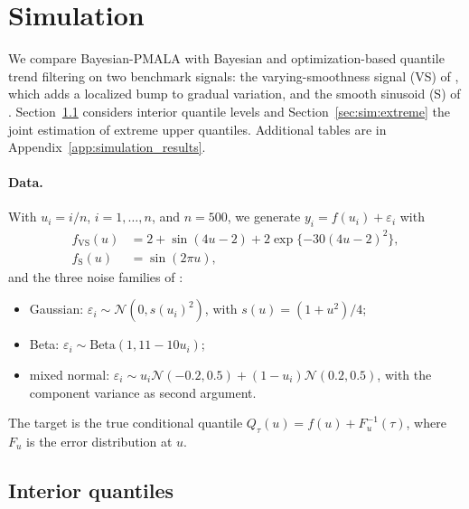 \section{Simulation}
\label{sec:simulations}

We compare Bayesian-PMALA with Bayesian and optimization-based quantile trend filtering on two benchmark signals: the varying-smoothness signal (VS) of \citet{onizuka2024fast}, which adds a localized bump to gradual variation, and the smooth sinusoid (S) of \citet{brantley2020baseline}. Section~\ref{sec:sim:individual} considers interior quantile levels and Section~\ref{sec:sim:extreme} the joint estimation of extreme upper quantiles. Additional tables are in Appendix~\ref{app:simulation_results}.

\paragraph{Data.} With $u_i=i/n$, $i=1,\ldots,n$, and $n=500$, we generate $y_i=f(u_i)+\varepsilon_i$ with
\begin{align}
 f_{\mathrm{VS}}(u)&=2+\sin(4u-2)+2\exp\{-30(4u-2)^2\},
 \label{eq:sim_vs}\\
 f_{\mathrm{S}}(u)&=\sin(2\pi u),
 \label{eq:sim_s}
\end{align}
and the three noise families of \citet{onizuka2024fast}:
\begin{itemize}
 \item Gaussian: $\varepsilon_i\sim\mathcal{N}(0,s(u_i)^2)$, with $s(u)=(1+u^2)/4$;
 \item Beta: $\varepsilon_i\sim\mathrm{Beta}(1,11-10u_i)$;
 \item mixed normal: $\varepsilon_i\sim u_i\mathcal{N}(-0.2,0.5)+(1-u_i)\mathcal{N}(0.2,0.5)$, with the component variance as second argument.
\end{itemize}
The target is the true conditional quantile $Q_\tau(u)=f(u)+F_u^{-1}(\tau)$, where $F_u$ is the error distribution at $u$.

\subsection{Interior quantiles}
\label{sec:sim:individual}

